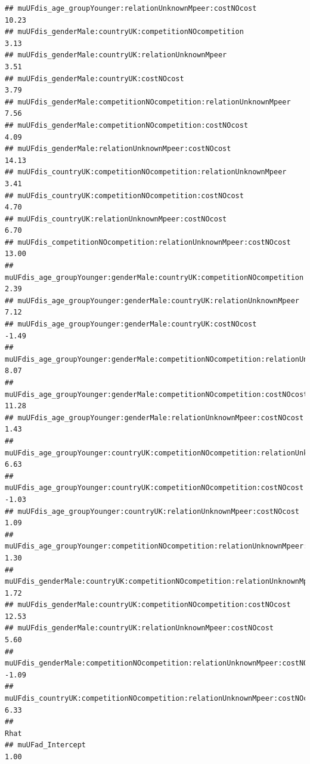 \documentclass[
]{article}
\begin{document}
\begin{verbatim}
## muUFdis_age_groupYounger:relationUnknownMpeer:costNOcost                             10.23
## muUFdis_genderMale:countryUK:competitionNOcompetition                                 3.13
## muUFdis_genderMale:countryUK:relationUnknownMpeer                                     3.51
## muUFdis_genderMale:countryUK:costNOcost                                               3.79
## muUFdis_genderMale:competitionNOcompetition:relationUnknownMpeer                      7.56
## muUFdis_genderMale:competitionNOcompetition:costNOcost                                4.09
## muUFdis_genderMale:relationUnknownMpeer:costNOcost                                   14.13
## muUFdis_countryUK:competitionNOcompetition:relationUnknownMpeer                       3.41
## muUFdis_countryUK:competitionNOcompetition:costNOcost                                 4.70
## muUFdis_countryUK:relationUnknownMpeer:costNOcost                                     6.70
## muUFdis_competitionNOcompetition:relationUnknownMpeer:costNOcost                     13.00
## muUFdis_age_groupYounger:genderMale:countryUK:competitionNOcompetition                2.39
## muUFdis_age_groupYounger:genderMale:countryUK:relationUnknownMpeer                    7.12
## muUFdis_age_groupYounger:genderMale:countryUK:costNOcost                             -1.49
## muUFdis_age_groupYounger:genderMale:competitionNOcompetition:relationUnknownMpeer     8.07
## muUFdis_age_groupYounger:genderMale:competitionNOcompetition:costNOcost              11.28
## muUFdis_age_groupYounger:genderMale:relationUnknownMpeer:costNOcost                   1.43
## muUFdis_age_groupYounger:countryUK:competitionNOcompetition:relationUnknownMpeer      6.63
## muUFdis_age_groupYounger:countryUK:competitionNOcompetition:costNOcost               -1.03
## muUFdis_age_groupYounger:countryUK:relationUnknownMpeer:costNOcost                    1.09
## muUFdis_age_groupYounger:competitionNOcompetition:relationUnknownMpeer:costNOcost     1.30
## muUFdis_genderMale:countryUK:competitionNOcompetition:relationUnknownMpeer            1.72
## muUFdis_genderMale:countryUK:competitionNOcompetition:costNOcost                     12.53
## muUFdis_genderMale:countryUK:relationUnknownMpeer:costNOcost                          5.60
## muUFdis_genderMale:competitionNOcompetition:relationUnknownMpeer:costNOcost          -1.09
## muUFdis_countryUK:competitionNOcompetition:relationUnknownMpeer:costNOcost            6.33
##                                                                                   Rhat
## muUFad_Intercept                                                                  1.00

\end{verbatim}
\end{document}
